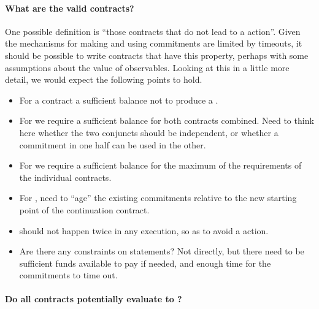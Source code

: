 \documentclass[
      acmsmall
    , screen
  ]{acmart}
\begin{document}
\paragraph{What are the valid contracts?}

One possible definition is ``those contracts that do not lead to a  action''.
Given the mechanisms for making and using commitments are limited by timeouts, it should be possible to write contracts that have this property, perhaps with some assumptions about the value of observables.
Looking at this in a little more detail, we would expect the following points to hold.
\begin{itemize}
\item For a  contract a sufficient balance not to produce a .
\item For  we require a sufficient balance for both contracts combined. Need to think here whether the two conjuncts should be independent, or whether a commitment in one half can be used in the other.
\item For  we require a sufficient balance for the maximum of the requirements of the individual contracts. 
\item For , need to ``age'' the existing commitments relative to the new starting point of the 
continuation contract.
\item {} should not happen twice in any execution, so as to avoid a
 action.
\item Are there any constraints on  statements? Not directly, but there need to be sufficient 
funds available to pay if needed, and enough time for the commitments to time out.
\end{itemize}

\paragraph{Do all contracts potentially evaluate to ?}
\end{document}
